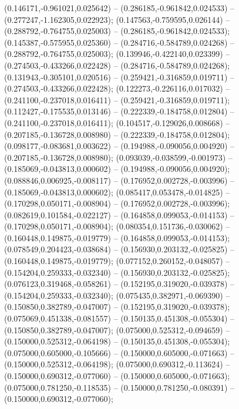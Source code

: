  (0.146171,-0.961021,0.025642) -- (0.286185,-0.961842,0.024533) -- (0.277247,-1.162305,0.022923);
 (0.147563,-0.759595,0.026144) -- (0.288792,-0.764755,0.025003) -- (0.286185,-0.961842,0.024533);
 (0.145387,-0.575955,0.025360) -- (0.284716,-0.584789,0.024268) -- (0.288792,-0.764755,0.025003);
 (0.139946,-0.422140,0.023399) -- (0.274503,-0.433266,0.022428) -- (0.284716,-0.584789,0.024268);
 (0.131943,-0.305101,0.020516) -- (0.259421,-0.316859,0.019711) -- (0.274503,-0.433266,0.022428);
 (0.122273,-0.226116,0.017032) -- (0.241100,-0.237018,0.016411) -- (0.259421,-0.316859,0.019711);
 (0.112427,-0.175535,0.013146) -- (0.222339,-0.184758,0.012804) -- (0.241100,-0.237018,0.016411);
 (0.104517,-0.129026,0.008668) -- (0.207185,-0.136728,0.008980) -- (0.222339,-0.184758,0.012804);
 (0.098177,-0.083681,0.003622) -- (0.194988,-0.090056,0.004920) -- (0.207185,-0.136728,0.008980);
 (0.093039,-0.038599,-0.001973) -- (0.185069,-0.043813,0.000602) -- (0.194988,-0.090056,0.004920);
 (0.088846,0.006925,-0.008117) -- (0.176952,0.002728,-0.003996) -- (0.185069,-0.043813,0.000602);
 (0.085417,0.053478,-0.014825) -- (0.170298,0.050171,-0.008904) -- (0.176952,0.002728,-0.003996);
 (0.082619,0.101584,-0.022127) -- (0.164858,0.099053,-0.014153) -- (0.170298,0.050171,-0.008904);
 (0.080354,0.151736,-0.030062) -- (0.160448,0.149875,-0.019779) -- (0.164858,0.099053,-0.014153);
 (0.078549,0.204423,-0.038684) -- (0.156930,0.203132,-0.025825) -- (0.160448,0.149875,-0.019779);
 (0.077152,0.260152,-0.048057) -- (0.154204,0.259333,-0.032340) -- (0.156930,0.203132,-0.025825);
 (0.076123,0.319468,-0.058261) -- (0.152195,0.319020,-0.039378) -- (0.154204,0.259333,-0.032340);
 (0.075435,0.382971,-0.069390) -- (0.150850,0.382789,-0.047007) -- (0.152195,0.319020,-0.039378);
 (0.075069,0.451338,-0.081557) -- (0.150135,0.451308,-0.055304) -- (0.150850,0.382789,-0.047007);
 (0.075000,0.525312,-0.094659) -- (0.150000,0.525312,-0.064198) -- (0.150135,0.451308,-0.055304);
 (0.075000,0.605000,-0.105666) -- (0.150000,0.605000,-0.071663) -- (0.150000,0.525312,-0.064198);
 (0.075000,0.690312,-0.113624) -- (0.150000,0.690312,-0.077060) -- (0.150000,0.605000,-0.071663);
 (0.075000,0.781250,-0.118535) -- (0.150000,0.781250,-0.080391) -- (0.150000,0.690312,-0.077060);
